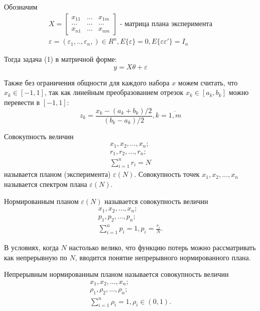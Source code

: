 Обозначим
\begin{gather}
X = 
\begin{bmatrix}
x_{11}	&	\dots	&	x_{1m}\\
\dots	&	\dots	&	\dots\\
x_{n1}	&	\dots	&	x_{nm}
\end{bmatrix} \text{ - матрица плана эксперимента} \\
\varepsilon = (\varepsilon_1,.., \varepsilon_n,) \in R^n, E\{\varepsilon\} = 0, E\{\varepsilon \varepsilon'\}=I_n
\end{gather}

Тогда задача (1) в матричной форме:
\begin{equation}
y = X \theta + \varepsilon
\end{equation}

Также без ограничения общности для каждого набора $x$ можем считать, что  $x_k \in [-1, 1]$, так как линейным преобразованием отрезок $x_k \in [a_k, b_k]$ можно перевести в $[-1, 1]$:
$$z_k = \frac{x_k - (a_k + b_k)/2}{(b_k - a_k)/2}, k = \overline{1, m}$$  

\begin{definition}
	Совокупность величин
	\begin{gather}
	x_1, x_2, \dots, x_n;\\
	r_1, r_2, \dots, r_n;\\
	\sum_{i=1}^n r_i = N
	\end{gather}
	называется планом (эксперимента) $\varepsilon(N)$. Совокупность точек  $x_1, x_2, \dots, x_n$ называется спектром плана $\varepsilon(N)$.
\end{definition}

\begin{definition}
	Нормированным планом $\varepsilon(N)$ называется совокупность величин
	\begin{gather}
	x_1, x_2, \dots, x_n;\\
	p_1, p_2, \dots, p_n;\\
	\sum_{i = 1}^n p_i = 1, p_i = \frac {r_i} {N}.
	\end{gather}
\end{definition}

В условиях, когда  $N$ настолько велико, что функцию потерь можно рассматривать как непрерывную по $N$, вводится понятие непрерывного нормированного плана.
\begin{definition}
	Непрерывным нормированным планом называется совокупность величин
	\begin{gather}
	x_1, x_2, \dots, x_n;\\
	\rho_1, \rho_2, \dots, \rho_n;\\
	\sum_{i = 1}^n \rho_i = 1, \rho_i \in (0, 1).
	\end{gather}
\end{definition}

